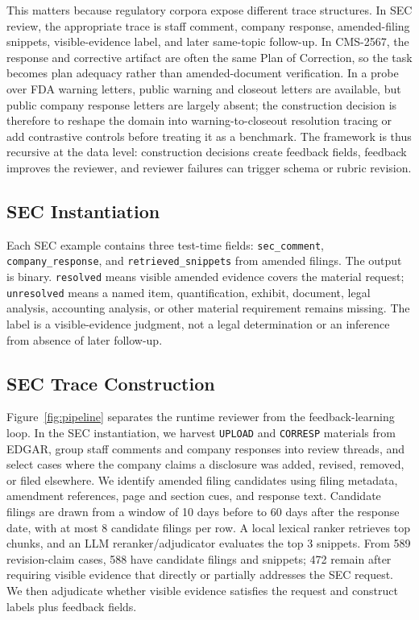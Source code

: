 \documentclass[11pt]{article}
\begin{document}
This matters because regulatory corpora expose different trace structures. In SEC review, the appropriate trace is staff comment, company response, amended-filing snippets, visible-evidence label, and later same-topic follow-up. In CMS-2567, the response and corrective artifact are often the same Plan of Correction, so the task becomes plan adequacy rather than amended-document verification. In a probe over FDA warning letters, public warning and closeout letters are available, but public company response letters are largely absent; the construction decision is therefore to reshape the domain into warning-to-closeout resolution tracing or add contrastive controls before treating it as a benchmark. The framework is thus recursive at the data level: construction decisions create feedback fields, feedback improves the reviewer, and reviewer failures can trigger schema or rubric revision.

\subsection{SEC Instantiation}

Each SEC example contains three test-time fields: \texttt{sec\_comment}, \texttt{company\_response}, and \texttt{retrieved\_snippets} from amended filings. The output is binary. \texttt{resolved} means visible amended evidence covers the material request; \texttt{unresolved} means a named item, quantification, exhibit, document, legal analysis, accounting analysis, or other material requirement remains missing. The label is a visible-evidence judgment, not a legal determination or an inference from absence of later follow-up.

\subsection{SEC Trace Construction}

Figure~\ref{fig:pipeline} separates the runtime reviewer from the feedback-learning loop. In the SEC instantiation, we harvest \texttt{UPLOAD} and \texttt{CORRESP} materials from EDGAR, group staff comments and company responses into review threads, and select cases where the company claims a disclosure was added, revised, removed, or filed elsewhere. We identify amended filing candidates using filing metadata, amendment references, page and section cues, and response text. Candidate filings are drawn from a window of 10 days before to 60 days after the response date, with at most 8 candidate filings per row. A local lexical ranker retrieves top chunks, and an LLM reranker/adjudicator evaluates the top 3 snippets. From 589 revision-claim cases, 588 have candidate filings and snippets; 472 remain after requiring visible evidence that directly or partially addresses the SEC request. We then adjudicate whether visible evidence satisfies the request and construct labels plus feedback fields.
\end{document}
